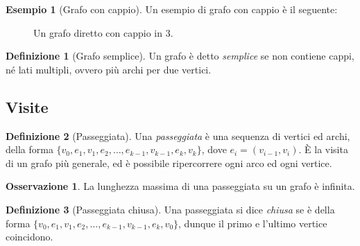 \documentclass[14pt]{extreport}
\theoremstyle{definition}
\newtheorem{definition}{Definizione}[subsection]
\theoremstyle{definition}
\newtheorem{remark}{Osservazione}[subsection]
\newtheorem{example}{Esempio}[subsection]
\begin{document}
\begin{example}[Grafo con cappio]
    Un esempio di grafo con cappio è il seguente:

    \begin{figure}[H]
        \centering
        \caption{Un grafo diretto con cappio in 3.}
    \end{figure}
\end{example}

\begin{definition}[Grafo semplice]
    Un grafo è detto \textit{semplice} se non contiene cappi, né lati multipli, ovvero più archi per due vertici.
\end{definition}

\subsection{Visite}

\begin{definition}[Passeggiata]
    Una \textit{passeggiata} è una sequenza di vertici ed archi, della forma $\{v_0, e_1, v_1, e_2, \ldots , e_{k - 1}, v_{k - 1}, e_k, v_k\}$, dove $e_i=(v_{i - 1}, v_i)$. È la visita di un grafo più generale, ed è possibile ripercorrere ogni arco ed ogni vertice.
\end{definition}

\begin{remark}
    La lunghezza massima di una passeggiata su un grafo è infinita.
\end{remark}

\begin{definition}[Passeggiata chiusa]
    Una passeggiata si dice \textit{chiusa} se è della forma $\{v_0, e_1, v_1, e_2, \ldots , e_{k - 1}, v_{k - 1}, e_k, v_0\}$, dunque il primo e l'ultimo vertice coincidono. 
\end{definition}
\end{document}

